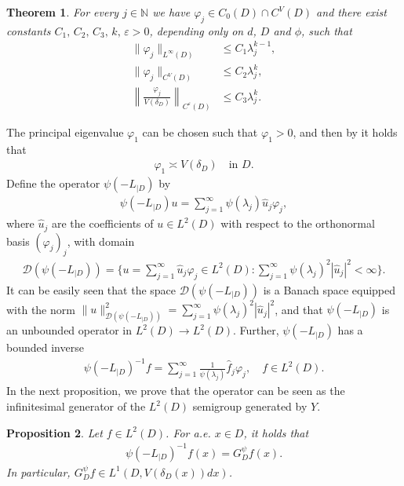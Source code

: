 \documentclass[12pt,a4paper,onecolumn]{article}
\newtheorem{thm}{Theorem}[section]
\newtheorem{prop}[thm]{Proposition}
\theoremstyle{definition}
\newcommand{\N}{\mathbb{N}}
\newcommand{\1}{\mathbf 1}
\newcommand{\de}{\delta_D}
\newcommand{\wh}{\widehat}
\newcommand{\LLL}{L^1(D,V(\de(x))dx)}
\newcommand{\DD}{\mathcal{D}}
\newcommand{\Lo}{\psi(-L_{|D})}
\newcommand{\LoInv}{\psi(-L_{|D})^{-1}}
\newcommand{\GDP}{G_D^\psi}
\numberwithin{equation}{section}
\begin{document}
	\begin{thm}\label{t:eigenfuncions}
		For every $j\in \N$ we have $\varphi_j\in C_0(D)\cap C^V(D)$ and there exist
		constants $C_1,\, C_2,\,C_3,\,k,\,\varepsilon>0$, depending only on $d$, $D$ and $\phi$, such that
		\begin{align}
			\|\varphi_j\|_{L^\infty(D)}&\le C_1\lambda_j^{k-1},\label{eq:eigen no0}\\
			\|\varphi_j\|_{C^{V}(D)}&\le C_2\lambda_j^{k},\label{eq:eigen no1}\\
			\left\|\frac{\varphi_j}{V(\de)}\right\|_{C^{\varepsilon}(D)}&\le
			C_3\lambda_j^{k}.\label{eq:eigen no2}
		\end{align}
	\end{thm}
		
	The principal eigenvalue $\varphi_1$ can be chosen such that $\varphi_1>0$, and then by \cite[Theorem 3.2 \& Theorem 3.3]{BL-na21} it holds that
	\begin{align}\label{eq:eigen sharp}
		\varphi_1\asymp V(\de)\quad \text{in $D$}.
	\end{align}
	Define the operator $\Lo$ by
	\begin{align*}
		\Lo u=\sum_{j=1}^\infty \psi(\lambda_j)\wh u_j \varphi_j,
	\end{align*}
	where $\wh u_j$ are the coefficients of $u\in L^2(D)$ with respect to the orthonormal basis $(\varphi_j)_j$, with domain
	\begin{align}\label{eq:domain L2 Lo}
		\DD(\Lo)=\{u=\sum_{j=1}^{\infty} \wh u_j \varphi_j\in L^2(D):
		\sum_{j=1}^\infty \psi(\lambda_j)^2|\wh u_j|^2<\infty\}.
	\end{align}
	It can be easily seen that the space $\DD(\Lo)$ is a Banach space equipped with the norm $\|u\|^2_{\DD(\Lo)}=\sum_{j=1}^\infty \psi(\lambda_j)^2|\wh u_j|^2$, and that $\Lo$ is an unbounded operator in $L^2(D)\to L^2(D)$. Further, $\Lo$ has a bounded inverse
	\begin{align*}
		\LoInv f=\sum_{j=1}^\infty \frac{1}{\psi(\lambda_j)}\wh f_j \varphi_j,\quad f \in L^2(D).
	\end{align*}
    In the next proposition, we prove that the operator can be seen as the infinitesimal generator of the $L^2(D)$ semigroup generated by $Y$.
	\begin{prop}\label{p:Lo inverse L2(D)}
		Let $f\in L^
        2(D)$. For a.e. $x\in D$, it holds that 
		\begin{align*}
			\LoInv f(x)=\GDP f(x).
		\end{align*}
        In particular, $\GDP f\in \LLL$.
	\end{prop}
\end{document}
